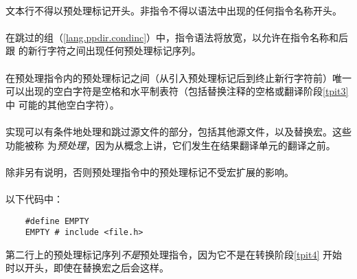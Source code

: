 \paragraph{}
文本行不得以预处理标记开头。非指令不得以语法中出现的任何指令名称开头。

\paragraph{}
在跳过的组（\ref{lang.ppdir.condinc}）中，指令语法将放宽，以允许在指令名称和后跟
的新行字符之间出现任何预处理标记序列。

\constraint
\paragraph{}
在预处理指令内的预处理标记之间（从引入预处理标记\tm{\#}后到终止新行字符前）唯一
可以出现的空白字符是空格和水平制表符（包括替换注释的空格或翻译阶段\ref{tpit3}中
可能的其他空白字符）。

\semantic
\paragraph{}
实现可以有条件地处理和跳过源文件的部分，包括其他源文件，以及替换宏。这些功能被称
为\textit{预处理}，因为从概念上讲，它们发生在结果翻译单元的翻译之前。

\paragraph{}
除非另有说明，否则预处理指令中的预处理标记不受宏扩展的影响。

\paragraph{}
\ex* 以下代码中：
\begin{lstlisting}
    #define EMPTY
    EMPTY # include <file.h>
\end{lstlisting}
第二行上的预处理标记序列\textit{不是}预处理指令，因为它不是在转换阶段\ref{tpit4}
开始时以\tm{\#}开头，即使在替换宏之后会这样。

\constraint

